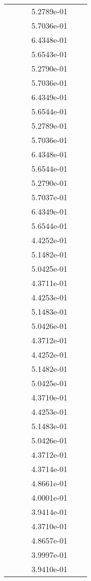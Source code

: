 \begin{xltabular}{\textwidth}{r|rS[table-format=1.3e+2]S[table-format=1.4e+2]S[table-format=1.4e+2]S[table-format=-1.5]}
&  &  & 5.2789e-01 & & \\
&  &  & 5.7036e-01 & & \\
&  &  & 6.4348e-01 & & \\
&  &  & 5.6543e-01 & & \\
&  &  & 5.2790e-01 & & \\
&  &  & 5.7036e-01 & & \\
&  &  & 6.4349e-01 & & \\
&  &  & 5.6544e-01 & & \\
&  &  & 5.2789e-01 & & \\
&  &  & 5.7036e-01 & & \\
&  &  & 6.4348e-01 & & \\
&  &  & 5.6544e-01 & & \\
&  &  & 5.2790e-01 & & \\
&  &  & 5.7037e-01 & & \\
&  &  & 6.4349e-01 & & \\
&  &  & 5.6544e-01 & & \\
&  &  & 4.4252e-01 & & \\
&  &  & 5.1482e-01 & & \\
&  &  & 5.0425e-01 & & \\
&  &  & 4.3711e-01 & & \\
&  &  & 4.4253e-01 & & \\
&  &  & 5.1483e-01 & & \\
&  &  & 5.0426e-01 & & \\
&  &  & 4.3712e-01 & & \\
&  &  & 4.4252e-01 & & \\
&  &  & 5.1482e-01 & & \\
&  &  & 5.0425e-01 & & \\
&  &  & 4.3710e-01 & & \\
&  &  & 4.4253e-01 & & \\
&  &  & 5.1483e-01 & & \\
&  &  & 5.0426e-01 & & \\
&  &  & 4.3712e-01 & & \\
&  &  & 4.3714e-01 & & \\
&  &  & 4.8661e-01 & & \\
&  &  & 4.0001e-01 & & \\
&  &  & 3.9414e-01 & & \\
&  &  & 4.3710e-01 & & \\
&  &  & 4.8657e-01 & & \\
&  &  & 3.9997e-01 & & \\
&  &  & 3.9410e-01 & & \\

\end{xltabular}
